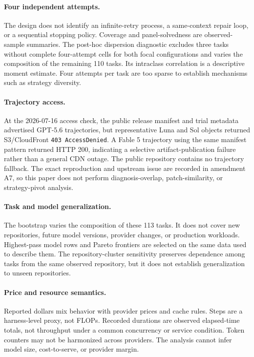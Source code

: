 \documentclass[11pt]{article}
\begin{document}
\paragraph{Four independent attempts.}
The design does not identify an infinite-retry process, a same-context repair loop, or a sequential
stopping policy. Coverage and panel-solvedness are observed-sample summaries. The post-hoc
dispersion diagnostic excludes three tasks without complete four-attempt cells for both focal
configurations and varies the composition of the remaining 110 tasks. Its intraclass correlation is
a descriptive moment estimate. Four attempts per task are too sparse to establish mechanisms such
as strategy diversity.

\paragraph{Trajectory access.}
At the 2026-07-16 access check, the public release manifest and trial metadata advertised GPT-5.6
trajectories, but representative Luna and Sol objects returned S3/CloudFront
\texttt{403 AccessDenied}. A Fable 5 trajectory using the same manifest pattern returned HTTP 200,
indicating a selective artifact-publication failure rather than a general CDN outage. The public
repository contains no trajectory fallback. The exact reproduction and upstream issue are recorded
in amendment A7, so this paper does not perform diagnosis-overlap, patch-similarity, or
strategy-pivot analysis.

\paragraph{Task and model generalization.}
The bootstrap varies the composition of these 113 tasks. It does not cover new repositories, future
model versions, provider changes, or production workloads. Highest-pass model rows and Pareto
frontiers are selected on the same data used to describe them. The repository-cluster sensitivity
preserves dependence among tasks from the same observed repository, but it does not establish
generalization to unseen repositories.

\paragraph{Price and resource semantics.}
Reported dollars mix behavior with provider prices and cache rules. Steps are a harness-level
proxy, not FLOPs. Recorded durations are observed elapsed-time totals, not throughput under a
common concurrency or service condition. Token counters may not be harmonized across providers.
The analysis cannot infer model size, cost-to-serve, or provider margin.
\end{document}
